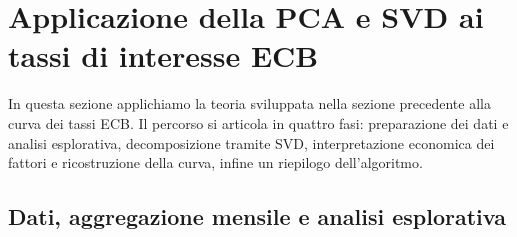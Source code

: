 \documentclass[11pt,a4paper]{article}
\theoremstyle{plain}
\theoremstyle{definition}
\theoremstyle{remark}
\newtheorem*{attenzione}{Nota numerica}
\begin{document}


\section{Applicazione della PCA e SVD ai tassi di interesse ECB}

In questa sezione applichiamo la teoria sviluppata nella sezione precedente alla
curva dei tassi ECB. Il percorso si articola in quattro fasi: preparazione dei dati
e analisi esplorativa, decomposizione tramite SVD, interpretazione economica dei
fattori e ricostruzione della curva, infine un riepilogo dell'algoritmo.

\subsection{Dati, aggregazione mensile e analisi esplorativa}
\end{document}
